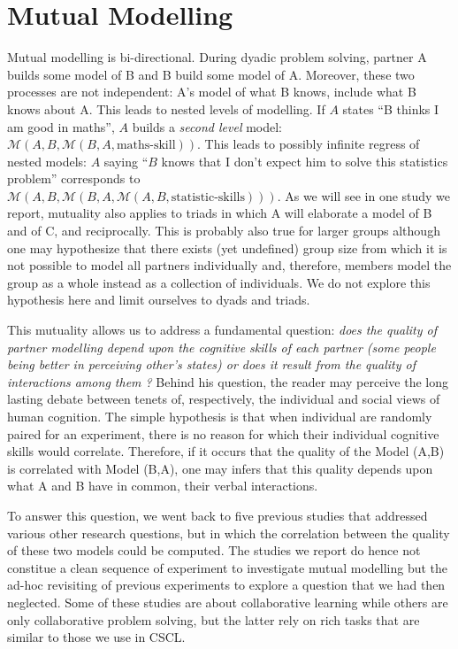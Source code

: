 \documentclass[natbib]{svjour3}
\newcommand{\M}[3]{{\mathcal{M}(#1, #2, #3)}}
\newcommand{\model}[3]{{$\mathcal{M}(#1, #2, #3)$}}
\begin{document}
\section{Mutual Modelling}

Mutual modelling is bi-directional. During dyadic problem solving,   partner A builds some model of B and B build some model of A.  Moreover, these two processes are not independent: A's model of what B knows, include what B knows about A.  This leads to nested levels of  modelling. If $A$ states ``B thinks I am good in
maths'', $A$ builds a \emph{second level} model:
\model{A}{B}{\M{B}{A}{\text{maths-skill}}}. This leads to possibly infinite
regress of nested models: $A$
saying ``$B$ knows that I don't expect him to solve this statistics problem''
corresponds to \\ \model{A}{B}{\M{B}{A}{\M{A}{B}{\text{statistic-skills}}}}.  As we will see in one study we report, mutuality also applies to triads in which A will elaborate a model of B and of C, and reciprocally. This is probably also true for larger groups although one may hypothesize that there exists (yet undefined) group size from which it is not possible to model all partners individually and, therefore, members  model  the group as a whole instead as a collection of individuals.  We do not explore this hypothesis here and limit ourselves to dyads and triads.

This mutuality allows us to address a fundamental question: \emph{does the quality of partner modelling depend upon the cognitive skills of each partner (some people being better in perceiving other's states) or does it result from the quality of interactions among them ?} Behind his question, the reader may perceive the long lasting debate between tenets of, respectively, the individual and social views of human cognition.  The simple hypothesis is that when individual are randomly paired for an experiment, there is no reason for which their individual cognitive skills would correlate. Therefore, if it occurs that the quality of the Model (A,B) is correlated with Model (B,A), one may infers that this quality depends upon what A and B have in common, their verbal interactions. 

To answer this question, we went back to five previous studies that addressed various other research questions, but in which the correlation between the quality of these two models could be computed.  The studies we report do hence not constitue a clean sequence of experiment to investigate mutual modelling but the ad-hoc revisiting of previous experiments to explore a question that we had then neglected. Some of these studies are about collaborative learning while others are only collaborative problem solving, but the latter rely on rich tasks that are similar to those we use in CSCL.
\end{document}
